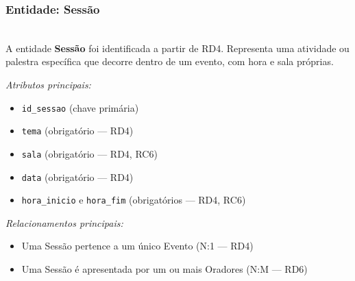 \documentclass[runningheads]{llncs}
\begin{document}
                \vspace{0.4cm}
                \noindent\begin{minipage}{\textwidth}
                \subsubsection{Entidade: Sessão}\mbox{}\\
                A entidade \textbf{Sessão} foi identificada a partir de RD4. Representa uma atividade
                ou palestra específica que decorre dentro de um evento, com hora e sala próprias.

                \vspace{0.2cm}
                \noindent\textit{Atributos principais:}
                \begin{itemize}
                    \item \texttt{id\_sessao} (chave primária)
                    \item \texttt{tema} (obrigatório --- RD4)
                    \item \texttt{sala} (obrigatório --- RD4, RC6)
                    \item \texttt{data} (obrigatório --- RD4)
                    \item \texttt{hora\_inicio} e \texttt{hora\_fim} (obrigatórios --- RD4, RC6)
                \end{itemize}

                \vspace{0.2cm}
                \noindent\textit{Relacionamentos principais:}
                \begin{itemize}
                    \item Uma Sessão pertence a um único Evento (N:1 --- RD4)
                    \item Uma Sessão é apresentada por um ou mais Oradores (N:M --- RD6)
                \end{itemize}
                \end{minipage}
\end{document}

